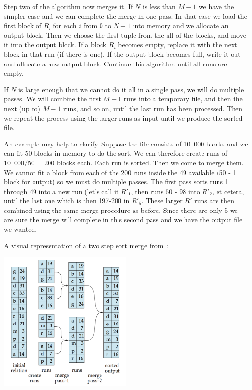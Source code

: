 Step two of the algorithm now merges it. If $N$ is less than $M-1$ we have the simpler case and we can complete the merge in one pass. In that case we load the first block of $R_{i}$ for each $i$ from $0$ to $N-1$ into memory and we allocate an output block. Then we choose the first tuple from the all of the blocks, and move it into the output block. If a block $R_{i}$ becomes empty, replace it with the next block in that run (if there is one). If the output block becomes full, write it out and allocate a new output block. Continue this algorithm until all runs are empty. 

If $N$ is large enough that we cannot do it all in a single pass, we will do multiple passes. We will combine the first $M-1$ runs into a temporary file, and then the next (up to) $M-1$ runs, and so on, until the last run has been processed. Then we repeat the process using the larger runs as input until we produce the sorted file.

An example may help to clarify. Suppose the file consists of 10~000 blocks and we can fit 50 blocks in memory to do the sort. We can therefore create runs of 10~000/50 = 200 blocks each. Each run is sorted. Then we come to merge them. We cannot fit a block from each of the 200 runs inside the 49 available (50 - 1 block for output) so we must do multiple passes. The first pass sorts runs 1 through 49 into a new run (let's call it $R'_{1}$, then runs 50 - 98 into $R'_{2}$, et cetera, until the last one which is then 197-200 in $R'_{5}$. These larger $R'$ runs are then combined using the same merge procedure as before. Since there are only 5 we are sure the merge will complete in this second pass and we have the output file we wanted.

A visual representation of a two step sort merge from~\cite{dsc}:

\begin{center}
	\includegraphics[width=0.5\textwidth]{images/external-merge}
\end{center}

